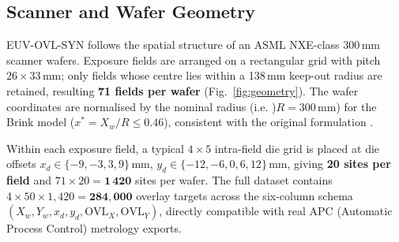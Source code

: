 \documentclass[10pt,conference]{IEEEtran}
\begin{document}
\subsection{Scanner and Wafer Geometry}

\textsc{EUV-OVL-SYN} follows the spatial structure of an ASML NXE-class
300\,mm scanner wafers.  Exposure fields are arranged on a rectangular grid with
pitch $26\!\times\!33$\,mm; only fields whose centre lies within a
138\,mm keep-out radius are retained, resulting \textbf{71 fields per wafer}
(Fig.~\ref{fig:geometry}).  The wafer coordinates are normalised by the
nominal radius (i.e. )$R=300$\,mm) for the Brink model
($x^* = X_w/R \le 0.46$), consistent with the original formulation
\cite{vandenBrink1996}.

Within each exposure field, a typical $4\!\times\!5$ intra-field die grid is placed
at die offsets $x_d \!\in\!\{-9, -3, 3, 9\}$\,mm,
$y_d\!\in\!\{-12, -6, 0, 6, 12\}$\,mm, giving \textbf{20 sites per field}
and $71 \times 20 = \mathbf{1\,420}$ sites per wafer.
The full dataset contains $4 \times 50 \times 1{,}420 = \mathbf{284{,}000}$
overlay targets across the six-column schema
$(X_w, Y_w, x_d, y_d, \mathrm{OVL}_X, \mathrm{OVL}_Y)$, directly
compatible with real APC (Automatic Process Control) metrology exports.
\end{document}
